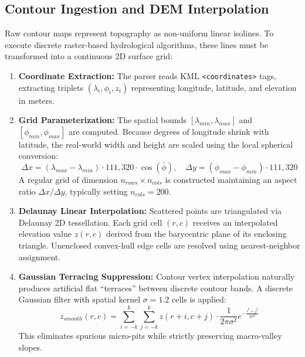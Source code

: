 \documentclass[manuscript,screen]{acmart}
\begin{document}
\subsection{Contour Ingestion and DEM Interpolation}
Raw contour maps represent topography as non-uniform linear isolines. To execute discrete raster-based hydrological algorithms, these lines must be transformed into a continuous 2D surface grid:
\begin{enumerate}
    \item \textbf{Coordinate Extraction:} The parser reads KML \texttt{<coordinates>} tags, extracting triplets $(\lambda_i, \phi_i, z_i)$ representing longitude, latitude, and elevation in meters.
    \item \textbf{Grid Parameterization:} The spatial bounds $[\lambda_{min}, \lambda_{max}]$ and $[\phi_{min}, \phi_{max}]$ are computed. Because degrees of longitude shrink with latitude, the real-world width and height are scaled using the local spherical conversion:
    \begin{equation}
        \Delta x = (\lambda_{max} - \lambda_{min}) \cdot 111{,}320 \cdot \cos(\bar{\phi}), \quad \Delta y = (\phi_{max} - \phi_{min}) \cdot 111{,}320
    \end{equation}
    A regular grid of dimension $n_{rows} \times n_{cols}$ is constructed maintaining an aspect ratio $\Delta x / \Delta y$, typically setting $n_{cols} = 200$.
    \item \textbf{Delaunay Linear Interpolation:} Scattered points are triangulated via Delaunay 2D tessellation. Each grid cell $(r, c)$ receives an interpolated elevation value $z(r, c)$ derived from the barycentric plane of its enclosing triangle. Unenclosed convex-hull edge cells are resolved using nearest-neighbor assignment.
    \item \textbf{Gaussian Terracing Suppression:} Contour vertex interpolation naturally produces artificial flat ``terraces'' between discrete contour bands. A discrete Gaussian filter with spatial kernel $\sigma = 1.2$ cells is applied:
    \begin{equation}
        z_{smooth}(r, c) = \sum_{i=-k}^{k} \sum_{j=-k}^{k} z(r+i, c+j) \cdot \frac{1}{2\pi\sigma^2} e^{-\frac{i^2+j^2}{2\sigma^2}}
    \end{equation}
    This eliminates spurious micro-pits while strictly preserving macro-valley slopes.
\end{enumerate}
\end{document}
